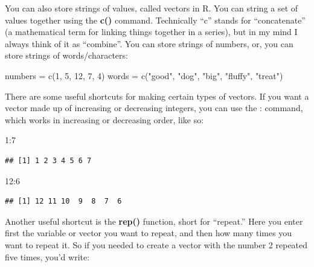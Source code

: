 \documentclass[
]{book}
\newenvironment{Shaded}{\begin{snugshade}}{\end{snugshade}}
\newcommand{\DecValTok}[1]{\textcolor[rgb]{0.00,0.00,0.81}{#1}}
\newcommand{\FunctionTok}[1]{\textcolor[rgb]{0.00,0.00,0.00}{#1}}
\newcommand{\NormalTok}[1]{#1}
\newcommand{\OtherTok}[1]{\textcolor[rgb]{0.56,0.35,0.01}{#1}}
\newcommand{\SpecialCharTok}[1]{\textcolor[rgb]{0.00,0.00,0.00}{#1}}
\newcommand{\StringTok}[1]{\textcolor[rgb]{0.31,0.60,0.02}{#1}}
\begin{document}
You can also store strings of values, called vectors in R. You can string a set of values together using the
\textbf{c()} command. Technically ``c'' stands for ``concatenate'' (a mathematical term for linking things together in a series), but in my mind I always think of it as ``combine''. You can store strings of numbers, or, you can store strings of words/characters:

\begin{Shaded}
\begin{Highlighting}[]
\NormalTok{numbers }\OtherTok{=} \FunctionTok{c}\NormalTok{(}\DecValTok{1}\NormalTok{, }\DecValTok{5}\NormalTok{, }\DecValTok{12}\NormalTok{, }\DecValTok{7}\NormalTok{, }\DecValTok{4}\NormalTok{)   }
\NormalTok{words }\OtherTok{=} \FunctionTok{c}\NormalTok{(}\StringTok{"good"}\NormalTok{, }\StringTok{"dog"}\NormalTok{, }\StringTok{"big"}\NormalTok{, }\StringTok{"fluffy"}\NormalTok{, }\StringTok{"treat"}\NormalTok{)}
\end{Highlighting}
\end{Shaded}

There are some useful shortcuts for making certain types of vectors. If you want a vector made up of increasing or decreasing integers, you can use the : command, which works in increasing or decreasing order, like so:

\begin{Shaded}
\begin{Highlighting}[]
\DecValTok{1}\SpecialCharTok{:}\DecValTok{7} 
\end{Highlighting}
\end{Shaded}

\begin{verbatim}
## [1] 1 2 3 4 5 6 7
\end{verbatim}

\begin{Shaded}
\begin{Highlighting}[]
\DecValTok{12}\SpecialCharTok{:}\DecValTok{6} 
\end{Highlighting}
\end{Shaded}

\begin{verbatim}
## [1] 12 11 10  9  8  7  6
\end{verbatim}

Another useful shortcut is the \textbf{rep()} function, short for ``repeat.'' Here you enter first the variable or vector you want to repeat, and then how many times you want to repeat it. So if you needed to create a vector with the number 2 repeated five times, you'd write:
\end{document}
